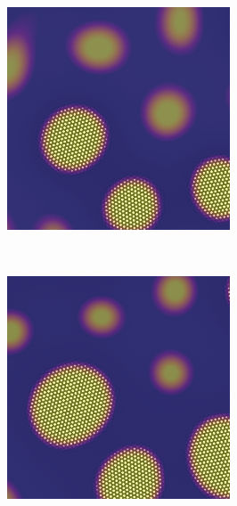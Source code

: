 \documentclass[showkeys, prb, reprint]{revtex4-1}
\begin{document}
\begin{figure}
    \vspace{0.25cm}
    \begin{subfigure}[b]{0.2\textwidth}
        \includegraphics[width=\textwidth]{nucleation_and_sacrificial_growth}
        \label{fig:nucleation_and_growth}
        \caption{} 
    \end{subfigure}
    ~
    \begin{subfigure}[b]{0.2\textwidth}
        \includegraphics[width=\textwidth]{sacrificalgrowth}

\end{subfigure}
\end{figure}
\end{document}
